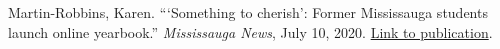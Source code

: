 \documentclass[a4paper,10pt]{article}
\begin{document}
\vspace{8pt}

Martin-Robbins, Karen. “‘Something to cherish’: Former Mississauga students launch online yearbook.” \textit{Mississauga News}, July 10, 2020. \href{https://www.mississauga.com/community-story/10071561--something-to-cherish-former-mississauga-students-launch-online-yearbook/}{Link to publication}.



\vfill
{}
\end{document}

